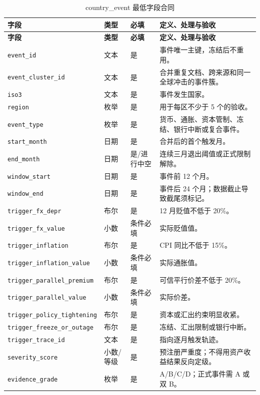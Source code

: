 \documentclass[UTF8,fontset=windows,12pt,openany]{ctexbook}
\newcommand{\Field}[1]{{\small\nolinkurl{#1}}}
\begin{document}
\begin{longtable}{p{3.6cm}p{2.3cm}p{2.1cm}p{5.2cm}}
\caption{country\_event 最低字段合同}\label{tab:dict-event}\\
\toprule
\textbf{字段} & \textbf{类型} & \textbf{必填} & \textbf{定义、处理与验收}\\
\midrule
\endfirsthead
\toprule \textbf{字段} & \textbf{类型} & \textbf{必填} & \textbf{定义、处理与验收}\\ \midrule
\endhead
\Field{event_id} & 文本 & 是 & 事件唯一主键，冻结后不重用。\\
\Field{event_cluster_id} & 文本 & 是 & 合并重复文档、跨来源和同一全球冲击的事件簇。\\
\Field{iso3} & 文本 & 是 & 事件发生国家。\\
\Field{region} & 枚举 & 是 & 用于每区不少于 5 个的验收。\\
\Field{event_type} & 枚举 & 是 & 货币、通胀、资本管制、冻结、银行中断或复合事件。\\
\Field{start_month} & 日期 & 是 & 合并后的首个触发月。\\
\Field{end_month} & 日期 & 是/进行中空 & 连续三月退出阈值或正式限制解除。\\
\Field{window_start} & 日期 & 是 & 事件前 12 个月。\\
\Field{window_end} & 日期 & 是 & 事件后 24 个月；数据截止导致截尾须标记。\\
\Field{trigger_fx_depr} & 布尔 & 是 & 12 月贬值不低于 20\%。\\
\Field{trigger_fx_value} & 小数 & 条件必填 & 实际贬值值。\\
\Field{trigger_inflation} & 布尔 & 是 & CPI 同比不低于 15\%。\\
\Field{trigger_inflation_value} & 小数 & 条件必填 & 实际通胀值。\\
\Field{trigger_parallel_premium} & 布尔 & 是 & 可信平行价差不低于 20\%。\\
\Field{trigger_parallel_value} & 小数 & 条件必填 & 实际价差。\\
\Field{trigger_policy_tightening} & 布尔 & 是 & 资本或汇出约束明显收紧。\\
\Field{trigger_freeze_or_outage} & 布尔 & 是 & 冻结、汇出限制或银行中断。\\
\Field{trigger_trace_id} & 文本 & 是 & 指向逐月触发轨迹。\\
\Field{severity_score} & 小数/等级 & 是 & 预注册严重度；不得用资产收益结果反向定级。\\
\Field{evidence_grade} & 枚举 & 是 & A/B/C/D；正式事件需 A 或双 B。\\

\end{longtable}
\end{document}
